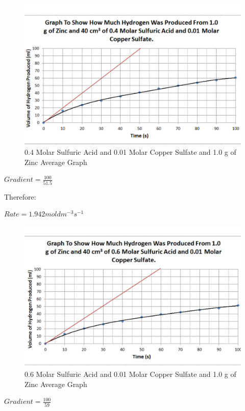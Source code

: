 \begin{figure}[H]
    \includegraphics[width=\textwidth]{./Analysis/Images/2Catalysed/04Molar.pdf}
    \caption{0.4 Molar Sulfuric Acid and 0.01 Molar Copper Sulfate and 1.0 g of Zinc Average Graph} \label{fig:04MolarSACSGradient}
\end{figure}

$Gradient = \frac{100}{51.5}$

Therefore:

$Rate = 1.942 mol dm^{-3} s^{-1}$

\begin{figure}[H]
    \includegraphics[width=\textwidth]{./Analysis/Images/2Catalysed/06Molar.pdf}
    \caption{0.6 Molar Sulfuric Acid and 0.01 Molar Copper Sulfate and 1.0 g of Zinc Average Graph} \label{fig:06MolarSACSGradient}
\end{figure}

$Gradient = \frac{100}{59}$

